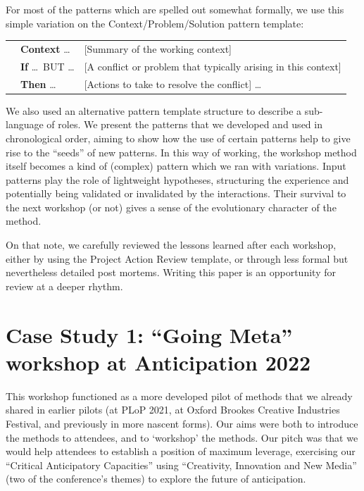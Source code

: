 \documentclass[acmlarge,timestamp]{acmart}
\begin{document}
For most of the patterns which are spelled out somewhat formally, we
use this simple variation on the Context/Problem/Solution pattern
template:
\smallskip

\begin{tabular}{lll}
\phantom{hellohellohello}& \textbf{Context} \ldots & {[}Summary of the working context{]}\\
\phantom{hellohellohello}&\textbf{If} \ldots\ BUT \ldots & {[}A conflict or problem that typically arising in this context{]}  \\
\phantom{hellohellohello}&\textbf{Then} \ldots & {[}Actions to take to resolve the conflict{]} \ldots
\end{tabular}
\smallskip

We also used an alternative pattern template structure to describe a
sub-language of roles.  We present the patterns that we developed and
used in chronological order, aiming to show how the use of certain
patterns help to give rise to the ``seeds'' of new patterns.  In this
way of working, the workshop method itself becomes a kind of (complex)
pattern which we ran with variations.  Input patterns play the role of
lightweight hypotheses, structuring the experience and potentially
being validated or invalidated by the interactions.  Their survival to
the next workshop (or not) gives a sense of the evolutionary character
of the method.

On that note, we carefully reviewed the lessons learned after each
workshop, either by using the Project Action Review template, or
through less formal but nevertheless detailed post mortems.  Writing
this paper is an opportunity for review at a deeper rhythm.

\clearpage

\section{Case Study 1: “Going Meta” workshop at Anticipation 2022}

This workshop functioned as a more developed pilot of methods that we
already shared in earlier pilots (at PLoP 2021, at Oxford Brookes
Creative Industries Festival, and previously in more nascent forms).
Our aims were both to introduce the methods to attendees, and to
‘workshop’ the methods.  Our pitch was that we would help attendees to
establish a position of maximum leverage, exercising our “Critical
Anticipatory Capacities” using “Creativity, Innovation and New Media”
(two of the conference’s themes) to explore the future of
anticipation.
\end{document}

